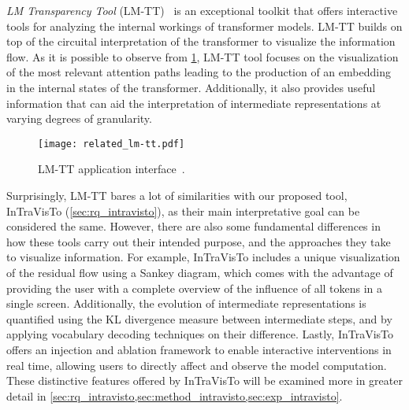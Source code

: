 \emph{LM Transparency Tool} (LM-TT)~\cite{tufanov2024} is an exceptional toolkit that offers interactive tools for analyzing the internal workings of transformer models.
LM-TT builds on top of the circuital interpretation of the transformer to visualize the information flow.
As it is possible to observe from \cref{fig:related_lm-tt}, LM-TT tool focuses on the visualization of the most relevant attention paths leading to the production of an embedding in the internal states of the transformer.
Additionally, it also provides useful information that can aid the interpretation of intermediate representations at varying degrees of granularity.

\begin{figure}[t!]
    \centering
    \texttt{[image: related\_lm-tt.pdf]}
    \caption{LM-TT application interface~\cite{tufanov2024}.}
    \label{fig:related_lm-tt}
\end{figure}

Surprisingly, LM-TT bares a lot of similarities with our proposed tool, InTraVisTo (\cref{sec:rq_intravisto}), as their main interpretative goal can be considered the same.
However, there are also some fundamental differences in how these tools carry out their intended purpose, and the approaches they take to visualize information.
For example, InTraVisTo includes a unique visualization of the residual flow using a Sankey diagram, which comes with the advantage of providing the user with a complete overview of the influence of all tokens in a single screen.
Additionally, the evolution of intermediate representations is quantified using the KL divergence measure between intermediate steps, and by applying vocabulary decoding techniques on their difference.
Lastly, InTraVisTo offers an injection and ablation framework to enable interactive interventions in real time, allowing users to directly affect and observe the model computation.
These distinctive features offered by InTraVisTo will be examined more in greater detail in \cref{sec:rq_intravisto,sec:method_intravisto,sec:exp_intravisto}.